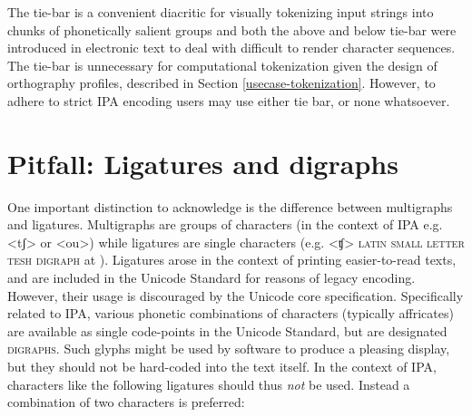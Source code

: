 The tie-bar is a convenient diacritic for visually tokenizing input strings into chunks of 
phonetically salient groups and both the above and below tie-bar were introduced in electronic 
text to deal with difficult to render character sequences. The tie-bar is unnecessary for 
computational tokenization given the design of orthography profiles, described in 
Section \ref{usecase-tokenization}. However, to adhere to strict IPA encoding users 
may use either tie bar, or none whatsoever. 

\begin{comment} 
Finally, the tie bar to indicate affricates, doubly articulated consonants or
diphthongs can be placed either below or on top of the base characters, e.g.
<\charis{t͡s}> or <\charis{t͜s}>. For strict IPA encoding we propose to standardize on the tie bar
above the base characters, using Unicode \textsc{combining double inverted
breve} at \uni{0361}. Note that this Unicode character is placed between the two 
base characters to be combined. In principle, it is possible to combine more 
than two base characters by repeating the tie bar, like in <a͡o͡u>. If really
necessary, we consider this possible, even though the rendering will never look 
good.

For strict IPA encoding we propose to standardize on the tie bar
above the base characters, using Unicode \textsc{combining double inverted
breve} at \uni{0361}. Note that this Unicode character is placed between the two 
base characters to be combined. In principle, it is possible to combine more 
than two base characters by repeating the tie bar, like in <a͡o͡u>. If really
necessary, we consider this possible, even though the rendering will never look 
good.\end{comment}



\section{Pitfall: Ligatures and digraphs}
\label{pitfall-ligatures-digraphs}     

One important distinction to acknowledge is the difference between multigraphs
and ligatures. Multigraphs are groups of characters (in the context of IPA e.g.
<tʃ> or <ou>) while ligatures are single characters (e.g. <ʧ> \textsc{latin
small letter tesh digraph} at ). Ligatures arose in the context of
printing easier-to-read texts, and are included in the Unicode Standard for
reasons of legacy encoding. However, their usage is discouraged by the Unicode
core specification. Specifically related to IPA, various phonetic combinations
of characters (typically affricates) are available as single code-points in the
Unicode Standard, but are designated \textsc{digraphs}. Such glyphs might be used by
software to produce a pleasing display, but they should not be hard-coded into
the text itself. In the context of IPA, characters like the following ligatures
should thus \emph{not} be used. Instead a combination of two characters is
preferred:
      
